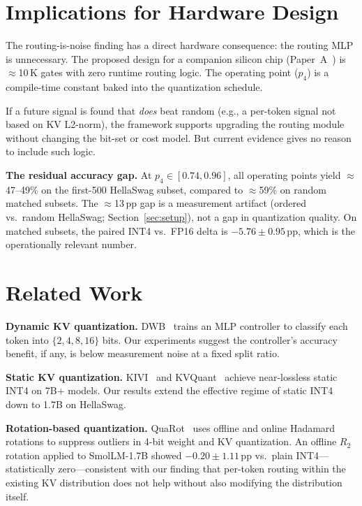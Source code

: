 \documentclass{article}
\begin{document}
\section{Implications for Hardware Design}
\label{sec:implications}

The routing-is-noise finding has a direct hardware consequence: the routing MLP is
unnecessary. The proposed design for a companion silicon chip (Paper~A~\citep{companion_paper_a})
is $\approx$10\,K gates with zero runtime routing logic. The operating point ($p_4$) is a
compile-time constant baked into the quantization schedule.

If a future signal is found that \emph{does} beat random (e.g., a per-token signal not based
on KV L2-norm), the framework supports upgrading the routing module without changing the
bit-set or cost model. But current evidence gives no reason to include such logic.

\textbf{The residual accuracy gap.} At $p_4\in[0.74,0.96]$, all operating points yield
$\approx$47--49\% on the first-500 HellaSwag subset, compared to $\approx$59\%
on random matched subsets. The $\approx$13\,pp gap is a measurement artifact (ordered vs.\
random HellaSwag; Section~\ref{sec:setup}), not a gap in quantization quality.
On matched subsets, the paired INT4 vs.\ FP16 delta is $-5.76\pm0.95$\,pp, which is the
operationally relevant number.

\section{Related Work}
\label{sec:related}

\textbf{Dynamic KV quantization.} DWB~\citep{haeri2026dwb} trains an MLP controller to
classify each token into $\{2,4,8,16\}$ bits. Our experiments suggest the controller's
accuracy benefit, if any, is below measurement noise at a fixed split ratio.

\textbf{Static KV quantization.} KIVI~\citep{liu2024kivi} and KVQuant~\citep{hooper2024kvquant}
achieve near-lossless static INT4 on 7B+ models. Our results extend the effective regime of
static INT4 down to 1.7B on HellaSwag.

\textbf{Rotation-based quantization.} QuaRot~\citep{ashkboos2024quarot} uses offline and
online Hadamard rotations to suppress outliers in 4-bit weight and KV quantization. An offline
$R_2$ rotation applied to SmolLM-1.7B showed $-0.20\pm1.11$\,pp vs.\ plain INT4---statistically
zero---consistent with our finding that per-token routing within the existing KV distribution
does not help without also modifying the distribution itself.
\end{document}
